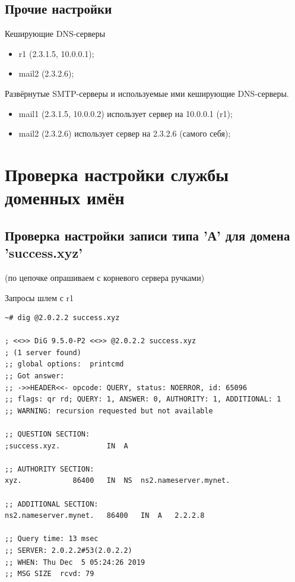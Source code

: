 \documentclass[a4paper,12pt]{article}
\begin{document}
\subsection{Прочие настройки}

Кеширующие DNS-серверы
\begin{itemize}
\item r1 (2.3.1.5, 10.0.0.1);
\item mail2 (2.3.2.6);
\end{itemize}

Развёрнутые SMTP-серверы и используемые ими кеширующие DNS-серверы.
\begin{itemize}
\item mail1 (2.3.1.5, 10.0.0.2) использует сервер на 10.0.0.1 (r1);
\item mail2 (2.3.2.6) использует сервер на 2.3.2.6 (самого себя);
\end{itemize}


\section{Проверка настройки службы доменных имён}

\subsection{Проверка настройки записи типа 'А' для домена 'success.xyz'}

(по цепочке опрашиваем с корневого сервера ручками)

Запросы шлем с r1

\begin{verbatim}
~# dig @2.0.2.2 success.xyz

; <<>> DiG 9.5.0-P2 <<>> @2.0.2.2 success.xyz
; (1 server found)
;; global options:  printcmd
;; Got answer:
;; ->>HEADER<<- opcode: QUERY, status: NOERROR, id: 65096
;; flags: qr rd; QUERY: 1, ANSWER: 0, AUTHORITY: 1, ADDITIONAL: 1
;; WARNING: recursion requested but not available

;; QUESTION SECTION:
;success.xyz.			IN	A

;; AUTHORITY SECTION:
xyz.			86400	IN	NS	ns2.nameserver.mynet.

;; ADDITIONAL SECTION:
ns2.nameserver.mynet.	86400	IN	A	2.2.2.8

;; Query time: 13 msec
;; SERVER: 2.0.2.2#53(2.0.2.2)
;; WHEN: Thu Dec  5 05:24:26 2019
;; MSG SIZE  rcvd: 79
\end{verbatim}
\end{document}
